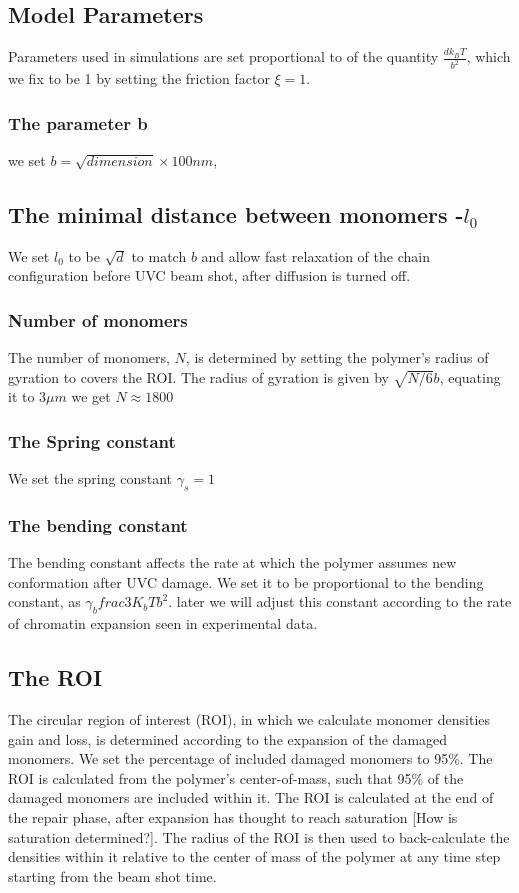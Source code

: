 \documentclass[12pt]{report}
\begin{document}
    \subsection{Model Parameters}
      Parameters used in simulations are set proportional to of the quantity $\frac{dk_BT}{b^2}$, which we fix to be 1 by setting the friction factor $\xi=1$. 
    \subsubsection{The parameter b} 
      we set $b=\sqrt{dimension} \times 100 nm$, 
    \subsection{The minimal distance between monomers -$l_0$}
     We set $l_0$ to be $\sqrt{d}$ to match $b$ and allow fast relaxation of the chain configuration before UVC beam shot, after diffusion is turned off. 
    \subsubsection{Number of monomers}
      The number of monomers, $N$, is determined by setting the polymer's radius of gyration to covers the ROI. The radius of gyration is given by $\sqrt{N/6}b$, equating it to $3\mu m$ we get $N\approx 1800$                      
     \subsubsection{The Spring constant}
       We set the spring constant $\gamma_s =1$
     \subsubsection{The bending constant}       
       The bending constant affects the rate at which the polymer assumes new conformation after UVC damage.
       We set it to be proportional to the bending constant, as $\gamma_b frac{3K_bT}{b^2}$. later we will adjust this constant according to the rate of chromatin expansion seen in experimental data. 
                   
    \subsection{The ROI}
    The circular region of interest (ROI), in which we calculate monomer densities gain and loss, is determined according to the expansion of the damaged monomers.
    We set the percentage of included damaged monomers to 95\%. The ROI is calculated from the polymer's center-of-mass, such that 95\% of the damaged monomers are included within it. 
    The ROI is calculated at the end of the repair phase, after expansion has thought to reach saturation [How is saturation determined?]. The radius of the ROI is then used to back-calculate the densities within it relative to the center of mass of the polymer at any time step starting from the beam shot time. 
    
\end{document}
